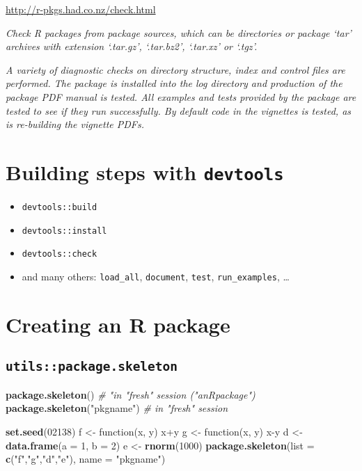 \documentclass[]{book}
\newenvironment{Shaded}{\begin{snugshade}}{\end{snugshade}}
\newcommand{\KeywordTok}[1]{\textcolor[rgb]{0.13,0.29,0.53}{\textbf{{#1}}}}
\newcommand{\DataTypeTok}[1]{\textcolor[rgb]{0.13,0.29,0.53}{{#1}}}
\newcommand{\DecValTok}[1]{\textcolor[rgb]{0.00,0.00,0.81}{{#1}}}
\newcommand{\StringTok}[1]{\textcolor[rgb]{0.31,0.60,0.02}{{#1}}}
\newcommand{\CommentTok}[1]{\textcolor[rgb]{0.56,0.35,0.01}{\textit{{#1}}}}
\newcommand{\NormalTok}[1]{{#1}}
\theoremstyle{definition}
\theoremstyle{definition}
\theoremstyle{definition}
\theoremstyle{remark}
\begin{document}
\url{http://r-pkgs.had.co.nz/check.html}

\emph{Check R packages from package sources, which can be directories or
package `tar' archives with extension `.tar.gz', `.tar.bz2', `.tar.xz'
or `.tgz'.}

\emph{A variety of diagnostic checks on directory structure, index and
control files are performed. The package is installed into the log
directory and production of the package PDF manual is tested. All
examples and tests provided by the package are tested to see if they run
successfully. By default code in the vignettes is tested, as is
re-building the vignette PDFs.}

\section{\texorpdfstring{Building steps with
\texttt{devtools}}{Building steps with devtools}}\label{building-steps-with-devtools}

\begin{itemize}
\item
  \texttt{devtools::build}
\item
  \texttt{devtools::install}
\item
  \texttt{devtools::check}
\item
  and many others: \texttt{load\_all}, \texttt{document}, \texttt{test},
  \texttt{run\_examples}, \ldots{}
\end{itemize}

\section{Creating an R package}\label{creating-an-r-package}

\subsection{\texorpdfstring{\texttt{utils::package.skeleton}}{utils::package.skeleton}}\label{utilspackage.skeleton}

\begin{Shaded}
\begin{Highlighting}[]
\KeywordTok{package.skeleton}\NormalTok{() }\CommentTok{# "in "fresh" session ("anRpackage")}
\KeywordTok{package.skeleton}\NormalTok{(}\StringTok{"pkgname"}\NormalTok{) }\CommentTok{# in "fresh" session}

\KeywordTok{set.seed}\NormalTok{(}\DecValTok{02138}\NormalTok{)}
\NormalTok{f <-}\StringTok{ }\NormalTok{function(x, y) x+y}
\NormalTok{g <-}\StringTok{ }\NormalTok{function(x, y) x-y}
\NormalTok{d <-}\StringTok{ }\KeywordTok{data.frame}\NormalTok{(}\DataTypeTok{a =} \DecValTok{1}\NormalTok{, }\DataTypeTok{b =} \DecValTok{2}\NormalTok{)}
\NormalTok{e <-}\StringTok{ }\KeywordTok{rnorm}\NormalTok{(}\DecValTok{1000}\NormalTok{)}
\KeywordTok{package.skeleton}\NormalTok{(}\DataTypeTok{list =} \KeywordTok{c}\NormalTok{(}\StringTok{"f"}\NormalTok{,}\StringTok{"g"}\NormalTok{,}\StringTok{"d"}\NormalTok{,}\StringTok{"e"}\NormalTok{), }\DataTypeTok{name =} \StringTok{"pkgname"}\NormalTok{)}
\end{Highlighting}
\end{Shaded}
\end{document}
